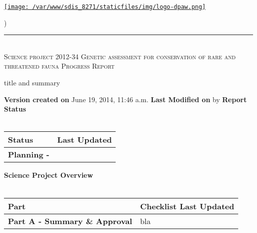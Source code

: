 \documentclass[version=last, paper=a4, DIV=18, usenames, dvipsnames]{scrartcl}
\newcommand{\HRule}{\rule{\linewidth}{0.1pt}}
\begin{document}
\setcounter{secnumdepth}{-1}


\begin{titlepage}
\begin{center}
\begin{minipage}[t]{0.28\textwidth}
\begin{flushleft}
\href{http://www.dpaw.wa.gov.au}{\texttt{[image: /var/www/sdis\_8271/staticfiles/img/logo-dpaw.png]}}
\end{flushleft}
\end{minipage}
\begin{minipage}[b]{0.7\textwidth}
\begin{flushright}
    \href{http://sdis.dpaw.wa.gov.au/documents/progressreport/1148/download/}{}) \\
\end{flushright}
\end{minipage}
\HRule \\[0.4cm]
\vfill
\textsc{\Huge Science project 2012-34 Genetic assessment for conservation of rare and threatened fauna \newline }
\vfill
\textsc{\Huge Progress Report}

\vfill\vfill\vfill\vfill
title and summary

\vfill\vfill\vfill\vfill\vfill\vfill\vfill\vfill

\textbf{Version created on} June 19, 2014, 11:46 a.m.
\vfill
\textbf{Last Modified on}  by 
\vfill\vfill
\textbf{Report Status}\\\,
\begin{tabu} to \linewidth { | X[l] | X | }
\hline
{}
Status & Last Updated \\
\hline
\textbf{Planning - } \\
\hline
\end{tabu}
\vfill
\textbf{Science Project Overview}\\\,
\begin{tabu} to \linewidth { | X[l] | X | }
\hline
{}
Part & Checklist Last Updated \\
\hline
\textbf{Part A - Summary \& Approval} & bla \\
\hline
\end{tabu}

\end{center}
\end{titlepage}

\setcounter{tocdepth}{2}
\tableofcontents
\clearpage
\end{document}
